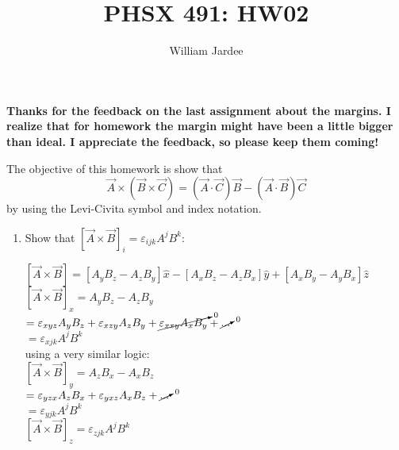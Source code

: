 \documentclass[12pt]{article}
\begin{document}
\title{PHSX 491: HW02}
\author{William Jardee}
\maketitle

{\bf Thanks for the feedback on the last assignment about the margins. I realize that for homework the margin might have been a little bigger than ideal. I appreciate the feedback, so please keep them coming!}
\bigskip

The objective of this homework is show that 
\[\vec{A}\times (\vec{B}\times \vec{C}) = (\vec{A}\cdot \vec{C})\vec{B} - (\vec{A}\cdot \vec{B})\vec{C}\]
by using the Levi-Civita symbol and index notation.

\begin{enumerate}[label=\alph*)]
\item Show that $[\vec{A}\times \vec{B}]_i = \varepsilon_{ijk}A^jB^k$:\vspace{0.5em}

$[\vec{A} \times \vec{B}] = [A_y B_z - A_z B_y]\hat{x} - [A_x B_z - A_z B_x]\hat{y} + [A_x B_y - A_y B_x]\hat{z}$\vspace{0.5em}\\
$[\vec{A} \times \vec{B}]_x = A_y B_z - A_z B_y$\vspace{0.5em}\\
\hspace*{4.1em}$= \varepsilon_{xyz}A_y B_z + \varepsilon_{xzy}A_z B_y + \cancelto{0}{\varepsilon_{xxy}A_x B_y} + \cancelto{0}{...}$\vspace{0.5em}\\
\hspace*{4.1em}$=\varepsilon_{xjk}A^jB^k$\vspace{0.5em}\\
using a very similar logic:\vspace{0.5em}\\
$[\vec{A}\times \vec{B}]_y = A_z B_x - A_x B_z$\vspace{0.5em}\\
\hspace*{4.1em}$= \varepsilon_{yzx} A_z B_x + \varepsilon_{yxz}A_x B_z + \cancelto{0}{...}$\vspace{0.5em}\\
\hspace*{4.1em}$= \varepsilon_{yjk}A^j B^k$\vspace{0.5em}\\
$[\vec{A}\times \vec{B}]_z = \varepsilon_{zjk}A^j B^k$


\end{enumerate}
\end{document}
